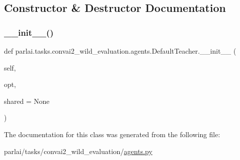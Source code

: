 \subsection{Constructor \& Destructor Documentation}
\mbox{\label{classparlai_1_1tasks_1_1convai2__wild__evaluation_1_1agents_1_1DefaultTeacher_a0952cee2a6035fb39bfba3ad0c04b8c3}} 
\subsubsection{\texorpdfstring{\+\_\+\+\_\+init\+\_\+\+\_\+()}{\_\_init\_\_()}}
{\footnotesize\ttfamily def parlai.\+tasks.\+convai2\+\_\+wild\+\_\+evaluation.\+agents.\+Default\+Teacher.\+\_\+\+\_\+init\+\_\+\+\_\+ (\begin{DoxyParamCaption}\item[{}]{self,  }\item[{}]{opt,  }\item[{}]{shared = {\ttfamily None} }\end{DoxyParamCaption})}



The documentation for this class was generated from the following file\+:\begin{DoxyCompactItemize}
\item 
parlai/tasks/convai2\+\_\+wild\+\_\+evaluation/\hyperlink{parlai_2tasks_2convai2__wild__evaluation_2agents_8py}{agents.\+py}\end{DoxyCompactItemize}
